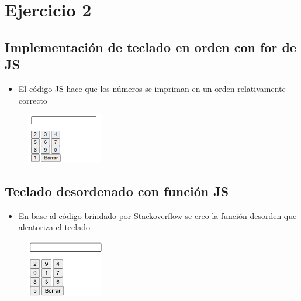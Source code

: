 \documentclass{article}
\begin{document}
	\section{Ejercicio 2}
	\subsection{Implementación de teclado en orden con for de JS}
	
	\begin{itemize}	
		\item El código JS hace que los números se impriman en un orden relativamente correcto
	\end{itemize}
	
	\begin{figure}[H]
		\centering
		\includegraphics[width=0.3\textwidth,keepaspectratio]{img/tec01.png}
	\end{figure}
\subsection{Teclado desordenado con función JS}
	
	\begin{itemize}	
		\item En base al código brindado por Stackoverflow se creo la
		 función desorden que aleatoriza el teclado
	\end{itemize}
	
	\begin{figure}[H]
		\centering
		\includegraphics[width=0.3\textwidth,keepaspectratio]{img/tec02.png}
	\end{figure}
\end{document}
